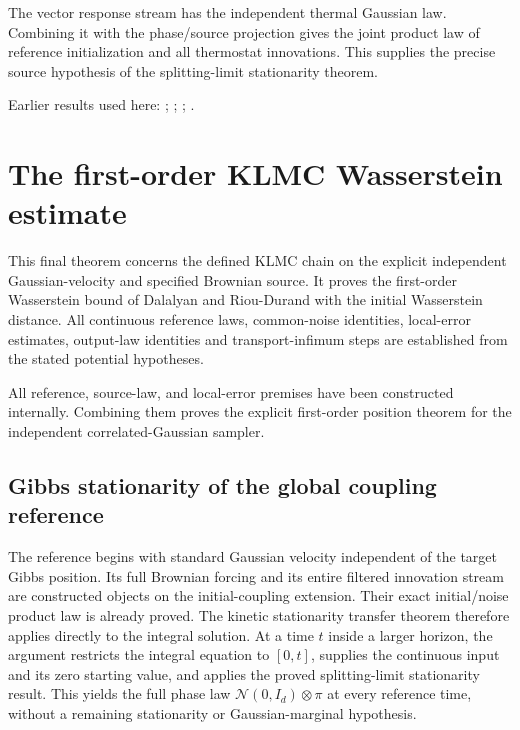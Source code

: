 \documentclass[11pt,a4paper]{report}
\begin{document}
The vector response stream has the independent thermal Gaussian law. Combining it with the phase/\allowbreak{}source projection gives the joint product law of reference initialization and all thermostat innovations. This supplies the precise source hypothesis of the splitting-limit stationarity theorem.



Earlier results used here: \cite[Section~3.17.1]{LangevinLean2026ULASC}; \cite[Section~3.22.6]{LangevinLean2026ULASC}; \cite[Section~3.8.16]{LangevinLean2026ULASC}; \cite[Section~3.8.17]{LangevinLean2026ULASC}.
\section{\texorpdfstring{The first-order KLMC Wasserstein estimate}{The first-order KLMC Wasserstein estimate}}
\label{proof-module-KineticLangevin-CanonicalKLMC-lean}


This final theorem concerns the defined KLMC chain on the explicit independent Gaussian-velocity and specified Brownian source. It proves the first-order Wasserstein bound of Dalalyan and Riou-Durand with the initial Wasserstein distance. All continuous reference laws, common-noise identities, local-error estimates, output-law identities and transport-infimum steps are established from the stated potential hypotheses.



All reference, source-law, and local-error premises have been constructed internally. Combining them proves the explicit first-order position theorem for the independent correlated-Gaussian sampler.

\subsection{\texorpdfstring{Gibbs stationarity of the global coupling reference}{Gibbs stationarity of the global coupling reference}}
\label{report-step-KineticLangevin-CanonicalKLMC-lean-1}


The reference begins with standard Gaussian velocity independent of the target Gibbs position. Its full Brownian forcing and its entire filtered innovation stream are constructed objects on the initial-coupling extension. Their exact initial/\allowbreak{}noise product law is already proved. The kinetic stationarity transfer theorem therefore applies directly to the integral solution. At a time \(t\) inside a larger horizon, the argument restricts the integral equation to \([0,t]\), supplies the continuous input and its zero starting value, and applies the proved splitting-limit stationarity result. This yields the full phase law \(\mathcal N(0,I_d)\otimes\pi\) at every reference time, without a remaining stationarity or Gaussian-marginal hypothesis.
\end{document}
